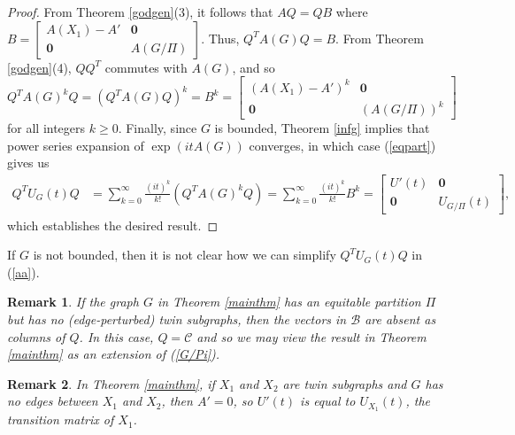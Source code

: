 \documentclass[12pt,a4paper]{article}
\newtheorem{rem}{Remark}
\def \e {{\bf e}}
\def \e {{\mathbf e}}
\newcommand{\ob}[1]{\left(#1\right)}
\begin{document}
\begin{proof}
From Theorem \ref{godgen}(3), it follows that $AQ=QB$ where $B=\begin{bmatrix}
     A(X_1)-A' & \mathbf{0}\\
     \mathbf{0} & A(G/\Pi)
     \end{bmatrix}$.
     Thus, $Q^TA(G)Q=B.$ From Theorem \ref{godgen}(4), $QQ^T$ commutes with $A(G)$, and so
\begin{equation}
\label{eqpart}
Q^TA(G)^kQ=(Q^TA(G)Q)^k=B^k=\begin{bmatrix}
     (A(X_1)-A')^k & \mathbf{0}\\
     \mathbf{0} & (A(G/\Pi))^k
     \end{bmatrix}
\end{equation}
for all integers $k\geq 0$. Finally, since $G$ is bounded, Theorem \ref{infg} implies that power series expansion of $\exp{(itA(G))}$ converges, in which case (\ref{eqpart}) gives us
\begin{equation}
\label{aa}
\begin{split}
Q^TU_G(t)Q &=\sum_{k=0}^\infty\frac{(it)^k}{k!}(Q^TA(G)^kQ)=\sum_{k=0}^\infty\frac{(it)^k}{k!}B^k=\begin{bmatrix}
     U'(t) & \mathbf{0}\\
     \mathbf{0} & U_{G/\Pi}(t)
     \end{bmatrix},
\end{split}
\end{equation}
which establishes the desired result.
\end{proof}

If $G$ is not bounded, then it is not clear how we can simplify $Q^TU_G(t)Q$ in (\ref{aa}).

\begin{rem}
If the graph $G$ in Theorem \ref{mainthm} has an equitable partition $\Pi$ but has no (edge-perturbed) twin subgraphs, then the vectors in $\mathcal{B}$ are absent as columns of $Q$. In this case, $Q=\mathcal{C}$ and so we may view the result in Theorem \ref{mainthm} as an extension of (\ref{G/Pi}).
\end{rem}

\begin{rem}
\label{A'}
In Theorem \ref{mainthm}, if $X_1$ and $X_2$ are twin subgraphs and $G$ has no edges between $X_1$ and $X_2$, then $A'=0$, so $U'(t)$ is equal to $U_{X_1}(t)$, the transition matrix of $X_1$.   \end{rem}
\end{document}
